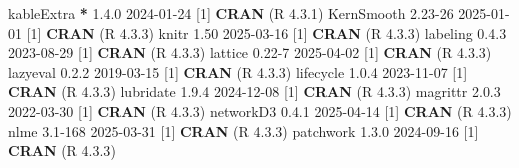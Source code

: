 \documentclass[
]{article}
\newenvironment{Shaded}{\begin{snugshade}}{\end{snugshade}}
\newcommand{\DecValTok}[1]{\textcolor[rgb]{0.00,0.00,0.81}{#1}}
\newcommand{\FloatTok}[1]{\textcolor[rgb]{0.00,0.00,0.81}{#1}}
\newcommand{\FunctionTok}[1]{\textcolor[rgb]{0.13,0.29,0.53}{\textbf{#1}}}
\newcommand{\NormalTok}[1]{#1}
\newcommand{\SpecialCharTok}[1]{\textcolor[rgb]{0.81,0.36,0.00}{\textbf{#1}}}
\begin{document}
\begin{Shaded}
\begin{Highlighting}[]
\NormalTok{ kableExtra    }\SpecialCharTok{*} \DecValTok{1}\NormalTok{.}\FloatTok{4.0}   \DecValTok{2024{-}01{-}24}\NormalTok{ [}\DecValTok{1}\NormalTok{] }\FunctionTok{CRAN}\NormalTok{ (R }\DecValTok{4}\NormalTok{.}\FloatTok{3.1}\NormalTok{)}
\NormalTok{ KernSmooth      }\FloatTok{2.23}\DecValTok{{-}26} \DecValTok{2025{-}01{-}01}\NormalTok{ [}\DecValTok{1}\NormalTok{] }\FunctionTok{CRAN}\NormalTok{ (R }\DecValTok{4}\NormalTok{.}\FloatTok{3.3}\NormalTok{)}
\NormalTok{ knitr           }\FloatTok{1.50}    \DecValTok{2025{-}03{-}16}\NormalTok{ [}\DecValTok{1}\NormalTok{] }\FunctionTok{CRAN}\NormalTok{ (R }\DecValTok{4}\NormalTok{.}\FloatTok{3.3}\NormalTok{)}
\NormalTok{ labeling        }\DecValTok{0}\NormalTok{.}\FloatTok{4.3}   \DecValTok{2023{-}08{-}29}\NormalTok{ [}\DecValTok{1}\NormalTok{] }\FunctionTok{CRAN}\NormalTok{ (R }\DecValTok{4}\NormalTok{.}\FloatTok{3.3}\NormalTok{)}
\NormalTok{ lattice         }\FloatTok{0.22}\DecValTok{{-}7}  \DecValTok{2025{-}04{-}02}\NormalTok{ [}\DecValTok{1}\NormalTok{] }\FunctionTok{CRAN}\NormalTok{ (R }\DecValTok{4}\NormalTok{.}\FloatTok{3.3}\NormalTok{)}
\NormalTok{ lazyeval        }\DecValTok{0}\NormalTok{.}\FloatTok{2.2}   \DecValTok{2019{-}03{-}15}\NormalTok{ [}\DecValTok{1}\NormalTok{] }\FunctionTok{CRAN}\NormalTok{ (R }\DecValTok{4}\NormalTok{.}\FloatTok{3.3}\NormalTok{)}
\NormalTok{ lifecycle       }\DecValTok{1}\NormalTok{.}\FloatTok{0.4}   \DecValTok{2023{-}11{-}07}\NormalTok{ [}\DecValTok{1}\NormalTok{] }\FunctionTok{CRAN}\NormalTok{ (R }\DecValTok{4}\NormalTok{.}\FloatTok{3.3}\NormalTok{)}
\NormalTok{ lubridate       }\DecValTok{1}\NormalTok{.}\FloatTok{9.4}   \DecValTok{2024{-}12{-}08}\NormalTok{ [}\DecValTok{1}\NormalTok{] }\FunctionTok{CRAN}\NormalTok{ (R }\DecValTok{4}\NormalTok{.}\FloatTok{3.3}\NormalTok{)}
\NormalTok{ magrittr        }\DecValTok{2}\NormalTok{.}\FloatTok{0.3}   \DecValTok{2022{-}03{-}30}\NormalTok{ [}\DecValTok{1}\NormalTok{] }\FunctionTok{CRAN}\NormalTok{ (R }\DecValTok{4}\NormalTok{.}\FloatTok{3.3}\NormalTok{)}
\NormalTok{ networkD3       }\DecValTok{0}\NormalTok{.}\FloatTok{4.1}   \DecValTok{2025{-}04{-}14}\NormalTok{ [}\DecValTok{1}\NormalTok{] }\FunctionTok{CRAN}\NormalTok{ (R }\DecValTok{4}\NormalTok{.}\FloatTok{3.3}\NormalTok{)}
\NormalTok{ nlme            }\FloatTok{3.1}\DecValTok{{-}168} \DecValTok{2025{-}03{-}31}\NormalTok{ [}\DecValTok{1}\NormalTok{] }\FunctionTok{CRAN}\NormalTok{ (R }\DecValTok{4}\NormalTok{.}\FloatTok{3.3}\NormalTok{)}
\NormalTok{ patchwork       }\DecValTok{1}\NormalTok{.}\FloatTok{3.0}   \DecValTok{2024{-}09{-}16}\NormalTok{ [}\DecValTok{1}\NormalTok{] }\FunctionTok{CRAN}\NormalTok{ (R }\DecValTok{4}\NormalTok{.}\FloatTok{3.3}\NormalTok{)}

\end{Highlighting}
\end{Shaded}
\end{document}
